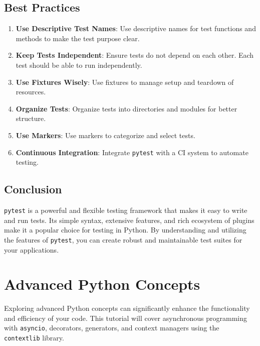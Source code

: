 \documentclass[
  letterpaper,
  DIV=11,
  numbers=noendperiod]{scrreprt}
\providecommand{\tightlist}{%
  \setlength{\itemsep}{0pt}\setlength{\parskip}{0pt}}\usepackage{longtable,booktabs,array}
\begin{document}
\section{Best Practices}\label{best-practices-1}

\begin{enumerate}
\def\labelenumi{\arabic{enumi}.}
\tightlist
\item
  \textbf{Use Descriptive Test Names}: Use descriptive names for test
  functions and methods to make the test purpose clear.
\item
  \textbf{Keep Tests Independent}: Ensure tests do not depend on each
  other. Each test should be able to run independently.
\item
  \textbf{Use Fixtures Wisely}: Use fixtures to manage setup and
  teardown of resources.
\item
  \textbf{Organize Tests}: Organize tests into directories and modules
  for better structure.
\item
  \textbf{Use Markers}: Use markers to categorize and select tests.
\item
  \textbf{Continuous Integration}: Integrate \texttt{pytest} with a CI
  system to automate testing.
\end{enumerate}

\section{Conclusion}\label{conclusion-32}

\texttt{pytest} is a powerful and flexible testing framework that makes
it easy to write and run tests. Its simple syntax, extensive features,
and rich ecosystem of plugins make it a popular choice for testing in
Python. By understanding and utilizing the features of \texttt{pytest},
you can create robust and maintainable test suites for your
applications.


\chapter{Advanced Python Concepts}\label{advanced-python-concepts}

Exploring advanced Python concepts can significantly enhance the
functionality and efficiency of your code. This tutorial will cover
asynchronous programming with \texttt{asyncio}, decorators, generators,
and context managers using the \texttt{contextlib} library.
\end{document}
